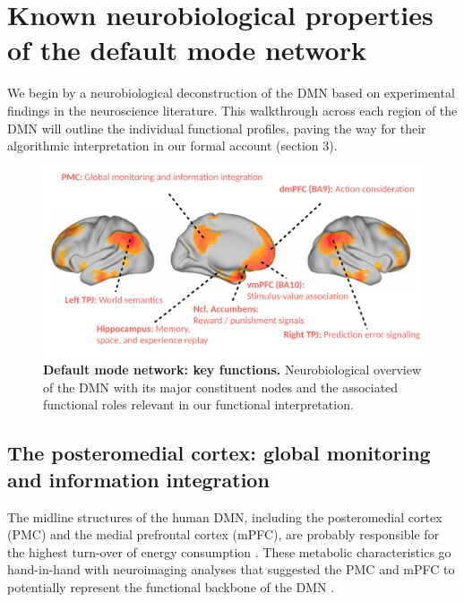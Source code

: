 \documentclass[10pt,letterpaper]{article}
\begin{document}
\section{Known neurobiological properties of the default mode network}
\label{sec:nodes}
We begin by a neurobiological deconstruction of the DMN
based on experimental findings in the neuroscience literature.
This walkthrough across each region of the DMN will
outline the individual functional profiles,
paving the way for their algorithmic interpretation
in our formal account (section 3).

\begin{figure}[!h]
  \includegraphics[width=.9\linewidth]{neurobiological_overview_DMN.pdf}
  \caption{\textbf{Default mode network: key functions.}
  Neurobiological overview of the DMN with its major constituent nodes and
  the associated functional roles relevant in our functional interpretation.}
  \label{fig:neurobiological_overview_DMN}
\end{figure}
%
\subsection{The posteromedial cortex: global monitoring and information integration}
The midline structures of the human DMN,
including the posteromedial cortex (PMC) and
the medial prefrontal cortex (mPFC),
are probably responsible for the highest turn-over
of energy consumption \citep{raichle2001pnas, raichle_baseline}.
These metabolic characteristics go hand-in-hand with
neuroimaging analyses that suggested the PMC and mPFC to
potentially represent the functional backbone of the DMN
\citep{andrews2010, hagmann2008mapping}.
\end{document}
